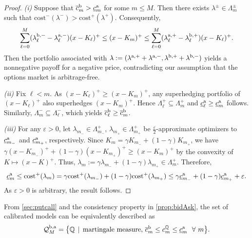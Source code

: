 \documentclass[11pt]{article}
\newcommand{\cQ}{\mathcal{Q}}
\newcommand{\Q}{\mathbb{Q}} %
\newcommand{\vae}{\varepsilon}
\theoremstyle{plain}
\theoremstyle{definition}
\theoremstyle{remark}
\theoremstyle{plain}
\begin{document}
\begin{proof}   

\textit{(i)} Suppose that $\overline{c}^{\rm b}_m >\underline{c}^{\rm a}_m$ for some $m\le M$. Then there exists $\lambda^{\pm} \in \Lambda_m^{\pm}$ such that $\text{cost}^{-}(\lambda^{-}) > \text{cost}^{+}(\lambda^{+})$. Consequently, 
$$ \sum_{\ell=0}^M  (\lambda^{\rm b,-}_{\ell} - \lambda^{\rm a,-}_{\ell})(x-K_{\ell})^+ \le (x-K_m)^+ \le \sum_{\ell=0}^M  (\lambda^{\rm a,+}_{\ell} - \lambda^{\rm b,+}_{\ell})(x-K_{\ell})^+. $$
Then the portfolio associated with $\lambda:= (\lambda^{\rm a,+}+\lambda^{\rm a,-},\lambda^{\rm b,+}+\lambda^{\rm b,-})$ yields a nonnegative payoff for a negative price, contradicting our assumption that the options market is arbitrage-free. 

\textit{(ii)} Fix $\ell < m$. As $(x-K_{\ell})^+ \ge (x-K_{m})^+$,  any superhedging portfolio of $(x-K_{\ell})^+$ also superhedges  $(x-K_{m})^+$. Hence $\Lambda_{\ell}^{+}\subseteq \Lambda_{m}^{+}$ and $\underline{c}^{\rm a}_{\ell} \ge \underline{c}^{\rm a}_{m}$ follows.  Similarly, $\Lambda_{m}^{-}\subseteq \Lambda_{\ell}^{-}$, which yields $\overline{c}^{\rm b}_{\ell} \ge \overline{c}^{\rm b}_{m}$. %

    \textit{(iii)} For any $\vae>0$, let %
    $\lambda_{m_{-}} \in \Lambda_{m_{-}}^+$,  $\lambda_{m_{+}} \in \Lambda_{m_{+}}^+$ 
    be  $\frac{\vae}{2}$-approximate optimizers to $\underline{c}^{\rm a}_{m_{-}}$ and  $\underline{c}^{\rm a}_{m_{+}}$, respectively. Since $K_{m} = \gamma K_{m_{-}} + (1-\gamma)K_{m_{+}}$, we have 
    $\gamma (x-K_{m_{-}})^+ + (1-\gamma) (x-K_{m_{+}})^+ \ge (x-K_{m})^+$ by the convexity of $K\mapsto (x-K)^+$. Thus, $\lambda_{m} := \gamma \lambda_{m_{-}} + (1-\gamma) \lambda_{m_{+}} \in \Lambda_{m}^+$. Therefore,
    \[
    \underline{c}^{\rm a}_{m} \leq \text{cost}^{+}(\lambda_{m}) =  \gamma \text{cost}^{+}(\lambda_{m_{-}}) + (1-\gamma)\text{cost}^{+}(\lambda_{m_{+}}) \leq \gamma\underline{c}^{\rm a}_{m_{-}} + (1-\gamma)\underline{c}^{\rm a}_{m_{+}} + \vae.
    \]
As $\vae>0$ is  arbitrary, the result follows. %
    
%
%
%
%
\end{proof}

%
%
From \cref{sec:putcall} and the consistency property in \cref{prop:bidAsk}, the set of calibrated models can be equivalently described as 
$$\cQ_M^{\rm b,a} = \big\{\Q  \, \mid \,   \text{martingale measure, }   \overline{c}_m^{\rm b} \le c_m^\Q \le \underline{c}_m^{\rm a} \ \ \forall \ m \big\}.$$ 
\end{document}
